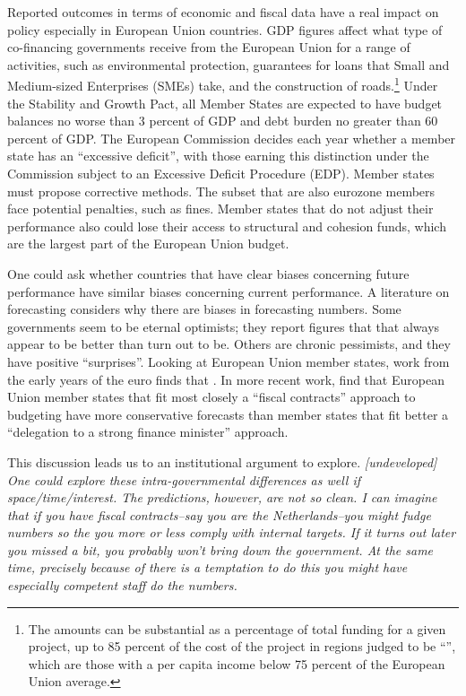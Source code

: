 \documentclass[]{article}
\begin{document}
Reported outcomes in terms of economic and fiscal data have a real impact on policy especially in European Union countries. GDP figures affect what type of co-financing governments receive from the European Union for a range of activities, such as environmental protection, guarantees for loans that Small and Medium-sized Enterprises (SMEs) take, and the construction of roads.\footnote{The amounts can be substantial as a percentage of total funding for a given project, up to 85 percent of the cost of the project in regions judged to be “”, which are those with a per capita income below 75 percent of the European Union average.} Under the Stability and Growth Pact, all Member States are expected to have budget balances no worse than 3 percent of GDP and debt burden no greater than 60 percent of GDP. The European Commission decides each year whether a member state has an ``excessive deficit'', with those earning this distinction under the Commission subject to an Excessive Deficit Procedure (EDP). Member states must propose corrective methods. The subset that are also eurozone members face potential penalties, such as fines. Member states that do not adjust their performance also could lose their access to structural and cohesion funds, which are the largest part of the European Union budget.

One could ask whether countries that have clear biases concerning future performance have similar biases concerning current performance. A literature on forecasting considers why there are biases in forecasting numbers. Some governments seem to be eternal optimists; they report figures that that always appear to be better than turn out to be. Others are chronic pessimists, and they have positive ``surprises''. Looking at European Union member states, work from the early years of the euro finds that \citep{hallerbergstrauch2002}. In more recent work, \cite{hallerbergstrauch209} find that European Union member states that fit most closely a ``fiscal contracts'' approach to budgeting have more conservative forecasts than member states that fit better a ``delegation to a strong finance minister'' approach.

This discussion leads us to an institutional argument to explore. \emph{[undeveloped] One could explore these intra-governmental differences as well if space/time/interest. The predictions, however, are not so clean. I can imagine that if you have fiscal contracts--say you are the Netherlands--you might fudge numbers so the you more or less comply with internal targets. If it turns out later you missed a bit, you probably won’t bring down the government. At the same time, precisely because of there is a temptation to do this you might have especially competent staff do the numbers.}
\end{document}
